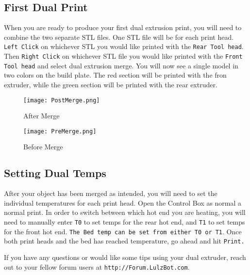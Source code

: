 \subsection{First Dual Print}
When you are ready to produce your first dual extrusion print, you will need to combine the two separate STL files. One STL file will be for each print head. \texttt{Left Click} on whichever STL you would like printed with the \texttt{Rear Tool head}. Then \texttt{Right Click} on whichever STL file you would like printed with the \texttt{Front Tool head} and select dual extrusion merge. You will now see a single model in two colors on the build plate. The red section will be printed with the fron extruder, while the green section will be printed with the rear extruder. 
\begin{figure}[H]
\centering
\texttt{[image: PostMerge.png]}
\caption{After Merge}
\label{fig:After Merge}
\end{figure}

\begin{figure}
\centering
\texttt{[image: PreMerge.png]}
\caption{Before Merge}
\label{fig:Before Merge}
\end{figure}

\subsection{Setting Dual Temps}
After your object has been merged as intended, you will need to set the individual temperatures for each print head. Open the Control Box as normal a normal print. In order to switch between which hot end you are heating, you will need to manually enter \texttt{T0} to set temps for the rear hot end, and \texttt{T1} to set temps for the front hot end. \texttt{The Bed temp can be set from either T0 or T1}. Once both print heads and the bed has reached temperature, go ahead and hit \texttt{Print.}

If you have any questions or would like some tips using your dual extruder, reach out to your fellow forum users at \texttt{http://Forum.LulzBot.com}.
